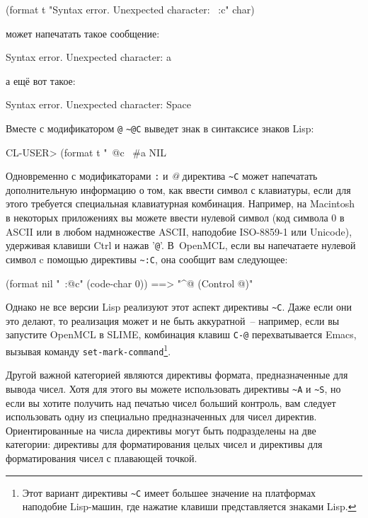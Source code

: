 \begin{myverb}
(format t "Syntax error. Unexpected character: ~:c" char)
\end{myverb}

\noindent{}может напечатать такое сообщение:

\begin{myverb}
  Syntax error. Unexpected character: a
\end{myverb}

\noindent{}а ещё вот такое:

\begin{myverb}
  Syntax error. Unexpected character: Space
\end{myverb}

Вместе с модификатором \lstinline!@! \lstinline!~@С! выведет знак в синтаксисе знаков
Lisp:

\begin{myverb}
CL-USER> (format t "~@c~%
#\bslash{}a
NIL
\end{myverb}

Одновременно с модификаторами \lstinline!:! и \textit{@} директива \lstinline!~C! может
напечатать дополнительную информацию о том, как ввести символ с клавиатуры, если для этого
требуется специальная клавиатурная комбинация. Например, на Macintosh в некоторых
приложениях вы можете ввести нулевой символ (код символа 0 в ASCII или в любом
надмножестве ASCII, наподобие ISO-8859-1 или Unicode), удерживая клавиши Ctrl и нажав
'\lstinline!@!'. В~OpenMCL, если вы напечатаете нулевой символ c помощью директивы
\lstinline!~:C!, она сообщит вам следующее:
  
\begin{myverb}
(format nil "~:@c" (code-char 0)) ==> "^@ (Control @)"
\end{myverb}

Однако не все версии Lisp реализуют этот аспект директивы \lstinline!~C!. Даже если они
это делают, то реализация может и не быть аккуратной~-- например, если вы за\-пусти\-те OpenMCL
в SLIME, комбинация клавиш \lstinline!C-@! перехватывается Emacs, вызывая команду
\lstinline{set-mark-command}\footnote{Этот вариант директивы \lstinline!~C! имеет большее
  значение на платформах наподобие Lisp-машин, где нажатие клавиши представляется знаками
  Lisp.}\hspace{\footnotenegspace}.
	
Другой важной категорией являются директивы формата, предназначенные для вывода
чисел. Хотя для этого вы можете использовать директивы \lstinline!~A! и \lstinline!~S!, но
если вы хотите получить над печатью чисел больший контроль, вам следует использовать одну
из специально предназначенных для чисел директив. Ориентированные на числа директивы могут
быть подразделены на две категории: директивы для форматирования целых чисел и директивы
для форматирования чисел с плавающей точкой.

